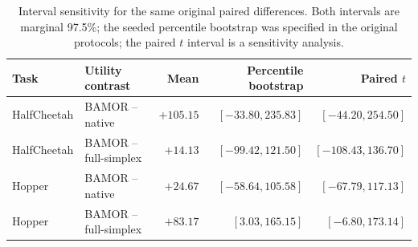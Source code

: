 \begin{table}[!htbp]
\centering\small\setlength{\tabcolsep}{4.5pt}
\caption{Interval sensitivity for the same original paired differences. Both intervals are marginal 97.5\%; the seeded percentile bootstrap was specified in the original protocols; the paired $t$ interval is a sensitivity analysis.}
\label{tab:ci_sensitivity}
\begin{tabular}{@{}llrrr@{}}
\toprule
Task & Utility contrast & Mean & Percentile bootstrap & Paired $t$ \\
\midrule
HalfCheetah & BAMOR -- native & $+105.15$ & ${[-33.80,235.83]}$ & ${[-44.20,254.50]}$ \\
HalfCheetah & BAMOR -- full-simplex & $+14.13$ & ${[-99.42,121.50]}$ & ${[-108.43,136.70]}$ \\
Hopper & BAMOR -- native & $+24.67$ & ${[-58.64,105.58]}$ & ${[-67.79,117.13]}$ \\
Hopper & BAMOR -- full-simplex & $+83.17$ & ${[3.03,165.15]}$ & ${[-6.80,173.14]}$ \\
\bottomrule
\end{tabular}
\end{table}
